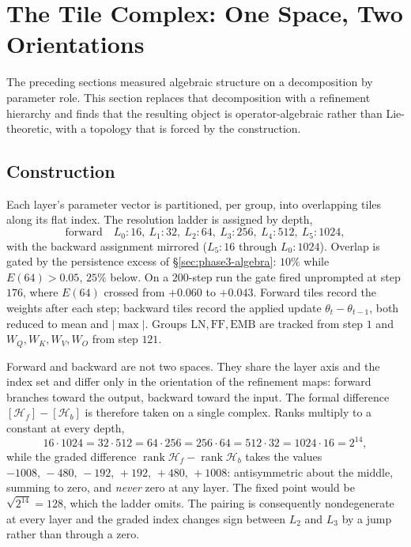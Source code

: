 \section{The Tile Complex: One Space, Two Orientations}
\label{sec:tile-complex}

The preceding sections measured algebraic structure on a decomposition by
parameter role. This section replaces that decomposition with a refinement
hierarchy and finds that the resulting object is operator-algebraic rather than
Lie-theoretic, with a topology that is forced by the construction.

\subsection{Construction}

Each layer's parameter vector is partitioned, per group, into overlapping tiles
along its flat index. The resolution ladder is assigned by depth,
\[
  \text{forward}\quad L_0{:}16,\ L_1{:}32,\ L_2{:}64,\ L_3{:}256,\ L_4{:}512,\ L_5{:}1024,
\]
with the backward assignment mirrored ($L_5{:}16$ through $L_0{:}1024$).
Overlap is gated by the persistence excess of \S\ref{sec:phase3-algebra}: $10\%$
while $E(64) > 0.05$, $25\%$ below. On a $200$-step run the gate fired
unprompted at step $176$, where $E(64)$ crossed from $+0.060$ to $+0.043$.
Forward tiles record the weights after each step; backward tiles record the
applied update $\theta_t - \theta_{t-1}$, both reduced to mean and $|\max|$.
Groups $\mathrm{LN},\mathrm{FF},\mathrm{EMB}$ are tracked from step $1$ and
$W_Q,W_K,W_V,W_O$ from step $121$.

\begin{observation}
Forward and backward are not two spaces. They share the layer axis and the
index set and differ only in the orientation of the refinement maps: forward
branches toward the output, backward toward the input. The formal difference
$[\mathcal{H}_f]-[\mathcal{H}_b]$ is therefore taken on a single complex.
Ranks multiply to a constant at every depth,
\[
  16\cdot 1024 = 32\cdot 512 = 64\cdot 256 = 256\cdot 64
  = 512\cdot 32 = 1024\cdot 16 = 2^{14},
\]
while the graded difference $\operatorname{rank}\mathcal{H}_f -
\operatorname{rank}\mathcal{H}_b$ takes the values
$-1008,\,-480,\,-192,\,+192,\,+480,\,+1008$: antisymmetric about the middle,
summing to zero, and \emph{never} zero at any layer. The fixed point would be
$\sqrt{2^{14}} = 128$, which the ladder omits. The pairing is consequently
nondegenerate at every layer and the graded index changes sign between $L_2$
and $L_3$ by a jump rather than through a zero.
\end{observation}

